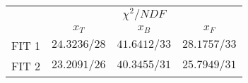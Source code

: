 \begin{tabular}{|l|lll|}
\hline
 & \multicolumn{3}{c|}{$\chi^2/NDF$} \\ \cline{2-4} 
      & \multicolumn{1}{c|}{$x_T$}          & \multicolumn{1}{c|}{$x_B$}          & \multicolumn{1}{c|}{$x_F$} \\ \hline
FIT 1 & \multicolumn{1}{l|}{$24.3236 / 28$} & \multicolumn{1}{l|}{$41.6412 / 33$} & $28.1757 / 33$             \\ \hline
FIT 2 & \multicolumn{1}{l|}{$23.2091 / 26$}  & \multicolumn{1}{l|}{$40.3455 / 31$} & $25.7949 / 31$             \\ \hline
\end{tabular}
